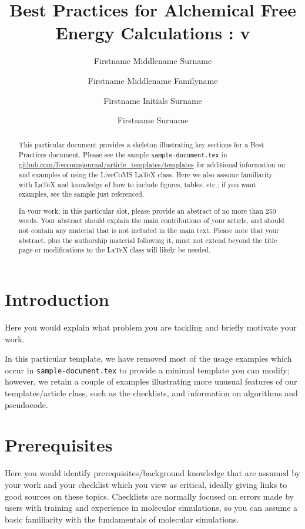 \documentclass[9pt,bestpractices]{livecoms}
\title{Best Practices for Alchemical Free Energy Calculations : v\versionnumber}
\author[1*]{Firstname Middlename Surname}
\author[1,2\authfn{1}\authfn{3}]{Firstname Middlename Familyname}
\author[2\authfn{1}\authfn{4}]{Firstname Initials Surname}
\author[2*]{Firstname Surname}
\affil[1]{Institution 1}
\affil[2]{Institution 2}
\begin{document}
\begin{frontmatter}
\maketitle

\begin{abstract}
This particular document provides a skeleton illustrating key sections for a Best Practices document. Please see the sample \texttt{sample-document.tex} in \url{github.com/livecomsjournal/article_templates/templates} for additional information on and examples of using the LiveCoMS LaTeX class.
Here we also assume familiarity with LaTeX and knowledge of how to include figures, tables, etc.; if you want examples, see the sample just referenced.

In your work, in this particular slot, please provide an abstract of no more than 250 words.
Your abstract should explain the main contributions of your article, and should not contain any material that is not included in the main text.
Please note that your abstract, plus the authorship material following it, must not extend beyond the title page or modifications to the LaTeX class will likely be needed.
\end{abstract}

\end{frontmatter}




\section{Introduction}

Here you would explain what problem you are tackling and briefly motivate your work.

In this particular template, we have removed most of the usage examples which occur in \texttt{sample-document.tex} to provide a minimal template you can modify; however, we retain a couple of examples illustrating more unusual features of our templates/article class, such as the checklists, and information on algorithms and pseudocode.

\section{Prerequisites}

Here you would identify prerequisites/background knowledge that are assumed by your work and your checklist which you view as critical, ideally giving links to good sources on these topics.
Checklists are normally focused on errors made by users with training and experience in molecular simulations, so you can assume a basic familiarity with the fundamentals of molecular simulations.
\end{document}

